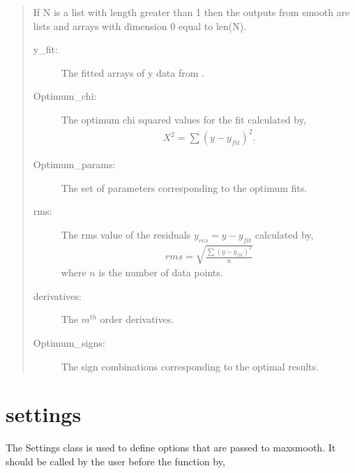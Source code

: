 \documentclass[letterpaper,10pt,english]{sphinxmanual}
\begin{document}
\begin{fulllineitems}
\begin{quote}

If N is a list with length greater than 1 then the outputs from smooth
are lists and arrays with dimension 0 equal to len(N).
\begin{description}
\item[{y\_fit:}] \leavevmode
{} The fitted arrays of y data from .

\item[{Optimum\_chi:}] \leavevmode
{} The optimum chi squared values for the fit calculated
by,
\begin{equation*}
\begin{split}{X^2=\sum(y-y_{fit})^2}.\end{split}
\end{equation*}
\item[{Optimum\_params:}] \leavevmode
{} The set of parameters corresponding to the optimum
fits.

\item[{rms:}] \leavevmode
{} The rms value of the residuals \({y_{res}=y-y_{fit}}\)
calculated by,
\begin{equation*}
\begin{split}{rms=\sqrt{\frac{\sum(y-y_{fit})^2}{n}}}\end{split}
\end{equation*}
where \(n\) is the number of data points.

\item[{derivatives:}] \leavevmode
{} The \(m^{th}\) order derivatives.

\item[{Optimum\_signs:}] \leavevmode
{} The sign combinations corresponding to the
optimal results.

\end{description}
\end{quote}

\end{fulllineitems}



\section{settings}
\label{\detokenize{source/maxsmooth:module-maxsmooth.settings}}\label{\detokenize{source/maxsmooth:settings}}
The Settings class is used to define options that are passed to maxsmooth.
It should be called by the user before the function  by,
\end{document}
